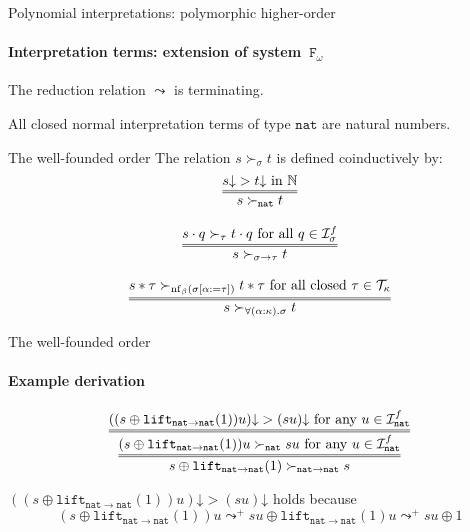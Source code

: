\documentclass[10pt,presentation,color=names]{beamer}
\newcommand{\Fomega}{\mathtt{F}_\omega}
\newcommand{\Iterms}{\mathcal{I}}
\newcommand{\arrtype}{\rightarrow}
\newcommand{\app}[2]{#1 \cdot #2}
\newcommand{\tapp}[2]{#1 * #2}
\newcommand{\subst}[2]{#1:=#2}
\newcommand{\nat}{\mathtt{nat}}
\newcommand{\lift}{\mathtt{lift}}
\newcommand{\Tc}{\mathcal{T}}
\newcommand{\nf}{\mathrm{nf}}
\newcommand{\da}{\mathord{\downarrow}}
\begin{document}
\begin{frame}{Polynomial interpretations: polymorphic higher-order}
  \framesubtitle{Interpretation terms: extension of system~$\Fomega$}
  \begin{theorem}
    The reduction relation $\leadsto$ is terminating.
  \end{theorem}
  \pause
  \begin{corollary}
    All closed normal interpretation terms of type $\nat$ are natural
    numbers.
  \end{corollary}
\end{frame}

\begin{frame}{The well-founded order}
  The relation $s \succ_{\sigma} t$ is defined coinductively by:
  \[
  \begin{array}{c}
    \infer={s \succ_\nat t}{s\da > t\da \text{ in }\mathbb{N}} \\ \\
    \infer={s \succ_{\sigma\arrtype\tau} t}{\app{s}{q} \succ_{\tau} \app{t}{q} \text{ for all } q \in \Iterms^f_\sigma} \\ \\
    \infer={s \succ_{\forall(\alpha:\kappa).\sigma} t}{\tapp{s}{\tau} \succ_{\nf_\beta(\sigma[\subst{\alpha}{\tau}])} \tapp{t}{\tau} \text{ for all closed } \tau \in \Tc_{\kappa}}
  \end{array}
  \]


\end{frame}

\begin{frame}{The well-founded order}
  \framesubtitle{Example derivation}
  \[
  \infer={s \oplus \lift_{\nat\to\nat}(1) \succ_{\nat\to\nat} s}{
    \infer={(s \oplus \lift_{\nat\to\nat}(1)) u \succ_\nat s u \text{ for any } u \in \Iterms^f_\nat}{
      ((s \oplus \lift_{\nat\to\nat}(1)) u)\da > (su)\da \text{ for any } u \in \Iterms^f_\nat
    }
  }
  \]

  \medskip
  \pause

  $((s \oplus \lift_{\nat\to\nat}(1)) u)\da > (su)\da$ holds because
  \[
  (s \oplus \lift_{\nat\to\nat}(1)) u \leadsto^+ su \oplus \lift_{\nat\to\nat}(1) u \leadsto^+ su \oplus 1
  \]
\end{frame}
\end{document}

